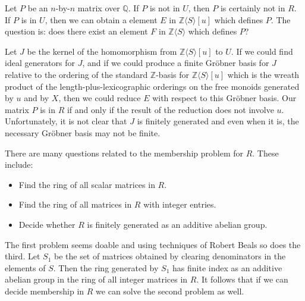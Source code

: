 \documentclass[12pt]{article}
\def\Z{{\mathbb Z}}
\def\Q{{\mathbb Q}}
\begin{document}
Let $P$ be an $n$-by-$n$ matrix over $\Q$.  If $P$ is not in $U$, then
$P$ is certainly not in $R$.  If $P$ is in $U$, then we can obtain a
element $E$ in $\Z\langle S\rangle[u]$ which defines $P$.  The question
is: does there exist an element $F$ in $\Z\langle S\rangle$ which
defines $P$?

Let $J$ be the kernel of the homomorphism from $\Z\langle S\rangle[u]$
to $U$.  If we could find ideal generators for $J$, and if we could
produce a finite Gr\"obner basis for $J$ relative to the ordering of
the standard $\Z$-basis for $\Z\langle S\rangle[u]$ which is the wreath
product of the length-plus-lexicographic orderings on the free monoids
generated by $u$ and by $X$, then we could reduce $E$ with respect to
this Gr\"obner basis.  Our matrix $P$ is in $R$ if and only if the
result of the reduction does not involve $u$.  Unfortunately, it is
not clear that $J$ is finitely generated and even when it is, the
necessary Gr\"obner basis may not be finite.

There are many questions related to the membership problem for $R$.
These include:

\begin{itemize}
  \item Find the ring of all scalar matrices in $R$.
  \item Find the ring of all matrices in $R$ with integer entries.
  \item Decide whether $R$ is finitely generated as an additive
abelian group.
\end{itemize}

The first problem seems doable and using techniques of Robert Beals so
does the third.  Let $S_1$ be the set of matrices obtained by clearing
denominators in the elements of $S$.  Then the ring generated by $S_1$
has finite index as an additive abelian group in the ring of all
integer matrices in $R$.  It follows that if we can decide membership
in $R$ we can solve the second problem as well.
\end{document}
